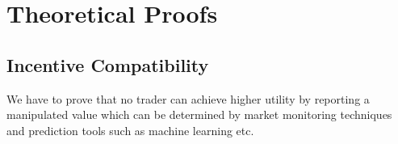 \section{Theoretical Proofs} \label{proofs}
\subsection{Incentive Compatibility}
We have to prove that no trader can achieve higher utility by reporting a manipulated value which can be determined by market monitoring techniques and prediction tools such as machine learning etc.




